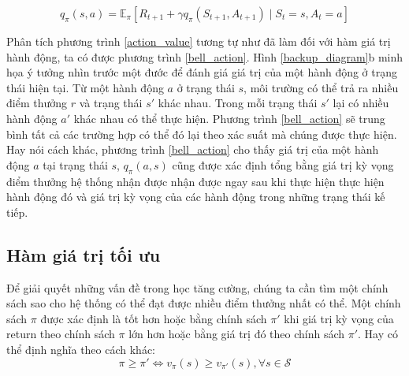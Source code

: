	\begin{equation}
		\label{bell_action}
		q_{\pi}(s,a) = \mathbb{E}_{\pi} \left[\mathit{R}_{t+1} + \gamma q_{\pi}(\mathit{S}_{t+1}, \mathit{A}_{t+1}) \mid \mathit{S}_t = s, \mathit{A}_t = a \right]
	\end{equation}
	
	Phân tích phương trình \ref{action_value} tương tự như đã làm đối với hàm giá trị hành động, ta có được phương trình \ref{bell_action}. Hình \ref{backup_diagram}b minh họa ý tưởng nhìn trước một đước để đánh giá giá trị của một hành động ở trạng thái hiện tại. Từ một hành động $a$ ở trạng thái $s$, môi trường có thể trả ra nhiều điểm thưởng $r$ và trạng thái $s'$ khác nhau. Trong mỗi trạng thái $s'$ lại có nhiều hành động $a'$ khác nhau có thể thực hiện.	Phương trình \ref{bell_action} sẽ trung bình tất cả các trường hợp có thể đó lại theo xác suất mà chúng được thực hiện. Hay nói cách khác, phương trình \ref{bell_action} cho thấy giá trị của một hành động $a$ tại trạng thái $s$, $q_{\pi}(a,s)$ cũng được xác định tổng bằng giá trị kỳ vọng điểm thưởng hệ thống nhận được nhận được ngay sau khi thực hiện thực hiện hành động đó và giá trị kỳ vọng của các hành động trong những trạng thái kế tiếp.
		
	\subsection{Hàm giá trị tối ưu}
	Để giải quyết những vấn đề trong học tăng cường, chúng ta cần tìm một chính sách sao cho hệ thống có thể đạt được nhiều điểm thưởng nhất có thể. Một chính sách $\pi$ được xác định là tốt hơn hoặc bằng chính sách $\pi'$ khi giá trị kỳ vọng của return theo chính sách $\pi$ lớn hơn hoặc bằng giá trị đó theo chính sách $\pi'$. Hay có thể định nghĩa theo cách khác:
	\begin{equation}
		\pi \geq \pi' \Longleftrightarrow v_{\pi}(s) \geq v_{\pi'}(s), \forall s \in \mathcal{S}
	\end{equation}
	
